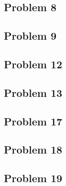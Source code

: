 \documentclass[11pt]{article}
\begin{document}
\subsection*{Problem 8}

\subsection*{Problem 9}

\subsection*{Problem 12}

\subsection*{Problem 13}

\subsection*{Problem 17}

\subsection*{Problem 18}

\subsection*{Problem 19}
\end{document}
